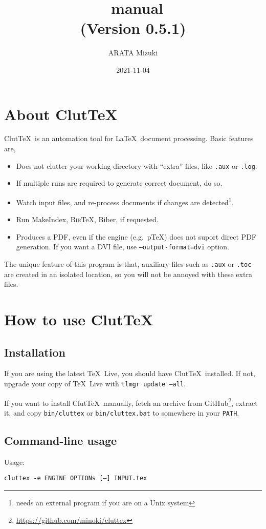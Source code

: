 \documentclass[a4paper]{report}
\title{\ClutTeX\ manual\\(Version 0.5.1)}
\author{ARATA Mizuki}
\date{2021-11-04}
\newcommand\ClutTeX{Clut\TeX}
\providecommand\BibTeX{\textsc{Bib}\TeX}
\newcommand\metavar[1]{\textnormal{\textsf{#1}}}
\begin{document}
\maketitle
\tableofcontents

\chapter{About \ClutTeX}
\ClutTeX\ is an automation tool for \LaTeX\ document processing.
Basic features are,
\begin{itemize}
\item Does not clutter your working directory with ``extra'' files, like \texttt{.aux} or \texttt{.log}.
\item If multiple runs are required to generate correct document, do so.
\item Watch input files, and re-process documents if changes are detected\footnote{needs an external program if you are on a Unix system}.
\item Run MakeIndex, \BibTeX, Biber, if requested.
\item Produces a PDF, even if the engine (e.g.\ p\TeX) does not suport direct PDF generation.
  If you want a DVI file, use \texttt{--output-format=dvi} option.
\end{itemize}

The unique feature of this program is that, auxiliary files such as \texttt{.aux} or \texttt{.toc} are created in an isolated location, so you will not be annoyed with these extra files.


\chapter{How to use \ClutTeX}
\section{Installation}
If you are using the latest \TeX\ Live, you should have \ClutTeX\ installed.
If not, upgrade your copy of \TeX\ Live with \texttt{tlmgr update --all}.

If you want to install \ClutTeX\ manually, fetch an archive from GitHub\footnote{\url{https://github.com/minoki/cluttex}}, extract it, and copy \texttt{bin/cluttex} or \texttt{bin/cluttex.bat} to somewhere in your \texttt{PATH}.

\section{Command-line usage}
Usage:
\begin{center}
  \texttt{cluttex -e \metavar{ENGINE} \metavar{OPTIONs} [--] \metavar{INPUT}.tex}
\end{center}
\end{document}
